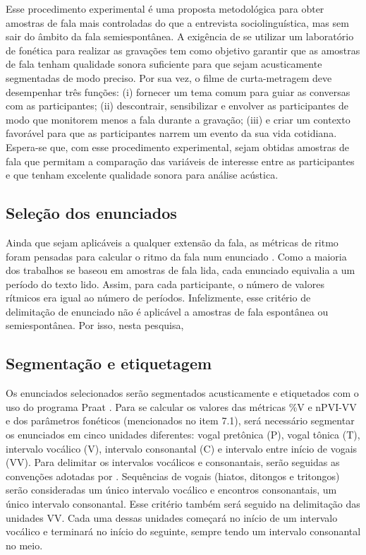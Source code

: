 \documentclass[
			a4paper,		%
			12pt,			%
			oneside,
			]{article}		%
\begin{document}
Esse procedimento experimental é uma proposta metodológica para obter amostras de fala 
mais controladas do que a entrevista sociolinguística, mas sem sair do âmbito da fala 
semiespontânea. A exigência de se utilizar um laboratório de fonética para realizar as 
gravações tem como objetivo garantir que as amostras de fala tenham qualidade sonora 
suficiente para que sejam acusticamente segmentadas de modo preciso. Por sua vez, o filme 
de curta-metragem deve desempenhar três funções: (i) fornecer um tema comum para guiar as 
conversas com as participantes; (ii) descontrair, sensibilizar e envolver as 
participantes de modo que monitorem menos a fala durante a gravação; (iii) e criar um 
contexto favorável para que as participantes narrem um evento da sua vida cotidiana. 
Espera-se que, com esse procedimento experimental, sejam obtidas amostras de fala que 
permitam a comparação das variáveis de interesse entre as participantes e que tenham 
excelente qualidade sonora para análise acústica.
	
	\subsection{Seleção dos enunciados}
	
Ainda que sejam aplicáveis a qualquer extensão da fala, as métricas de ritmo foram 
pensadas para calcular o ritmo da fala num enunciado \citep{Fuchs2016}. Como a maioria 
dos trabalhos se baseou em amostras de fala lida, cada enunciado equivalia a um período 
do texto lido. Assim, para cada participante, o número de valores rítmicos era igual ao 
número de períodos. Infelizmente, esse critério de delimitação de enunciado não é 
aplicável a amostras de fala espontânea ou semiespontânea. Por isso, nesta pesquisa, 	

	\subsection{Segmentação e etiquetagem}

Os enunciados selecionados serão segmentados acusticamente e etiquetados com o uso do 
programa Praat \citep{Boersma.Weenink2019}. Para se calcular os valores das métricas \%V 
e nPVI-VV e dos parâmetros fonéticos (mencionados no item 7.1), será necessário segmentar 
os enunciados em cinco unidades diferentes: vogal pretônica (P), vogal tônica (T), 
intervalo vocálico (V), intervalo consonantal (C) e intervalo entre início de vogais 
(VV). Para delimitar os intervalos vocálicos e consonantais, serão seguidas as convenções 
adotadas por \citet{Ramus.etal1999}. Sequências de vogais (hiatos, ditongos e 
tritongos) serão consideradas um único intervalo vocálico e encontros consonantais, um 
único intervalo consonantal. Esse critério também será seguido na delimitação das 
unidades VV. Cada uma dessas unidades começará no início de um intervalo vocálico e 
terminará no início do seguinte, sempre tendo um intervalo consonantal no meio.
\end{document}

